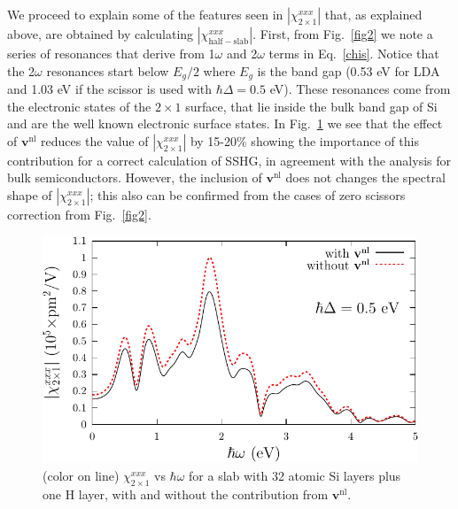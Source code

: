\documentclass[floatfix,prb,aps,superscriptaddress,showpacs,11pt,preprint,letterpaper]{revtex4}
\begin{document}
We proceed to explain 
some of the features seen in $|\chi^{xxx}_{2\times 1}|$ that, as
explained above, are obtained 
by calculating $|\chi^{xxx}_{\mathrm{half-slab}}|$.
First, from Fig.~\ref{fig2} we note a series of resonances 
that derive from 1$\omega$ and 2$\omega$ terms in
Eq.~\eqref{chis}. 
Notice that the 
2$\omega$ resonances start below $E_g/2$ where $E_g$ is the band gap
(0.53 eV  for LDA and
1.03 eV if the scissor is used with
$\hbar\Delta=0.5$ eV).
These resonances
come from the electronic states of the 
$2\times 1$ surface, that lie inside the bulk band gap of Si and are the 
well known electronic surface states.\cite{rohlfingPRB95} 
In Fig.~\ref{fig3}
we see that the effect of $\mathbf{v}^\mathrm{nl}$
 reduces the value of   
$|\chi^{xxx}_{2\times 1}|$  
by 15-20\% 
showing the importance of this contribution for a correct calculation  
of SSHG, in agreement with the analysis for bulk semiconductors.\cite{luppiPRB08}
However, the inclusion of $\mathbf{v}^\mathrm{nl}$ does not
changes the 
spectral shape of $|\chi^{xxx}_{2\times 1}|$;
 this also can be confirmed from
the cases of zero scissors correction from Fig.~\ref{fig2}.
\begin{figure}
\centering 
\includegraphics[scale=.8]{fig5}
\caption{(color on line) 
$\chi^{xxx}_{2\times 1}$
vs $\hbar\omega$ for a slab with 32 
atomic Si layers plus one H layer, 
with and without the contribution from $\mathbf{v}^\mathrm{nl}$.
\label{fig3}} 
\end{figure}
\end{document}

